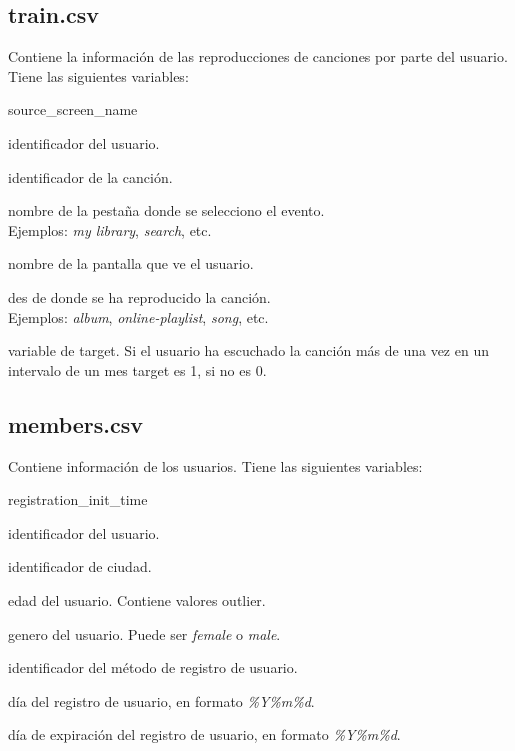\documentclass[a4paper]{article}
\begin{document}
\subsection*{train.csv}
Contiene la información de las reproducciones de canciones por parte del usuario. Tiene las siguientes variables:
\begin{labeling}{source\_screen\_name}
\item [msno] identificador del usuario.
\item [song\_id] identificador de la canción.
\item [source\_system\_tab] nombre de la pestaña donde se selecciono el evento.\\ Ejemplos: \textit{my library}, \textit{search}, etc.
\item [source\_screen\_name] nombre de la pantalla que ve el usuario.
\item [source\_type] des de donde se ha reproducido la canción.\\ Ejemplos: \textit{album}, \textit{online-playlist}, \textit{song}, etc.
\item [target] variable de target. Si el usuario ha escuchado la canción más de una vez en un intervalo de un mes target es 1, si no es 0.
\end{labeling}

\subsection*{members.csv}
Contiene información de los usuarios. Tiene las siguientes variables:
\begin{labeling}{registration\_init\_time}
\item [msno] identificador del usuario.
\item [city] identificador de ciudad.
\item [bd] edad del usuario. Contiene valores outlier.
\item [gender] genero del usuario. Puede ser \textit{female} o \textit{male}.
\item [registered\_via] identificador del método de registro de usuario.
\item [registration\_init\_time] día del registro de usuario, en formato \textit{\%Y\%m\%d}.
\item [expiration\_date] día de expiración del registro de usuario, en formato \textit{\%Y\%m\%d}.
\end{labeling}
\end{document}
